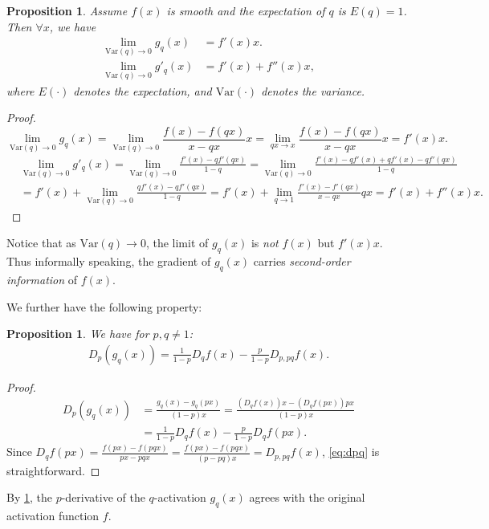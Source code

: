 \documentclass{article}
\def\Var{\mathrm{Var}}
\newtheorem{proposition}[theorem]{Proposition}
\begin{document}
\begin{proposition}\label{thm:limit}
Assume $f(x)$ is smooth and the expectation of $q$ is $E(q)=1$. Then $\forall{x}$, we have
\begin{align}
\lim_{\mathrm{Var}(q)\to0}  g_q(x) &=
f'(x) x.\nonumber\\
\lim_{\mathrm{Var}(q)\to0} g'_q(x) &=
f'(x) + f''(x) x,\nonumber
\end{align}
where $E(\cdot)$ denotes the expectation, and $\mathrm{Var}(\cdot)$ denotes the variance.
\end{proposition}
\begin{proof}
\begin{equation*}
\lim_{\mathrm{Var}(q)\to0}  g_q(x)
= \lim_{\mathrm{Var}(q)\to0}  \frac{f(x)-f(qx)}{x-qx} x
= \lim_{qx\to{x}}  \frac{f(x)-f(qx)}{x-qx} x
= f'(x)x.
\end{equation*}
\begin{align*}
&\lim_{\mathrm{Var}(q)\to0} g'_q(x)
= \lim_{\mathrm{Var}(q)\to0} \frac{f'(x)-qf'(qx)}{1-q}
= \lim_{\mathrm{Var}(q)\to0} \frac{f'(x)-q f'(x) + qf'(x) - qf'(qx)}{1-q}\\
&=f'(x) + \lim_{\mathrm{Var}(q)\to0} \frac{qf'(x) - qf'(qx)}{1-q}
= f'(x) + \lim_{q\to1} \frac{f'(x) - f'(qx)}{x-qx} qx
= f'(x) + f''(x) x.
\end{align*}
\end{proof}
Notice that as $\Var(q)\to 0$, the limit of $g_q(x)$ is {\em not} $f(x)$ but $f'(x)x$.
Thus informally speaking, the gradient of $g_q(x)$ carries {\em second-order information} of $f(x)$.


We further have the following property:

\begin{proposition}\label{thm:dpq}
We have for $p,q\not =1$:
\begin{align}\label{eq:dpq}
D_p(g_q(x)) = \frac{1}{1-p} D_q f(x) - \frac{p}{1-p} D_{p,pq} f(x).
\end{align}
\end{proposition}

\begin{proof}
\begin{align}
D_p(g_q(x))
&=
\frac{g_q(x)-g_q(px)}{(1-p)x}
=
\frac{ \left(D_qf(x)\right) x - \left(D_qf(px)\right)px}{(1-p)x}\nonumber\\
&=
\frac{1}{1-p}D_qf(x) -\frac{p}{1-p}D_qf(px).
\end{align}
Since $D_q f(px)=\frac{f(px)-f(pqx)}{px-pqx}=
\frac{f(px)-f(pqx)}{(p-pq)x}=D_{p,pq} f(x)$,
\cref{eq:dpq} is straightforward.
\end{proof}
By \cref{thm:dpq}, the $p$-derivative of 
the $q$-activation $g_q(x)$ agrees with the original activation function $f$.
\end{document}

